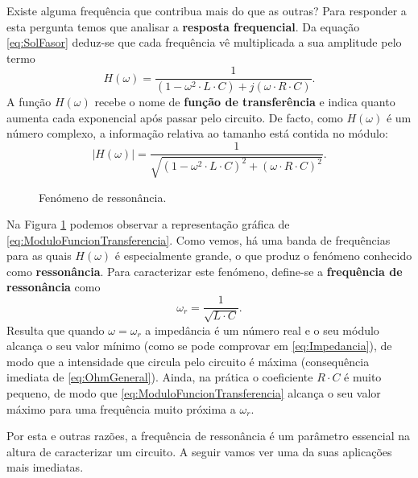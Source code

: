Existe alguma frequência que contribua mais do que as outras? Para responder a esta pergunta temos que analisar a \textbf{resposta frequencial}. Da equação \eqref{eq:SolFasor} deduz-se que cada frequência vê multiplicada a sua amplitude pelo termo
\begin{equation}
  \label{eq:FuncionTransferencia}
  H(\omega) = \frac{1}{(1-\omega^2 \cdot L\cdot C) + j(\omega \cdot R\cdot C)}.
\end{equation}
A função $H(\omega)$ recebe o nome de \textbf{função de transferência} e indica quanto aumenta cada exponencial após passar pelo circuito. De facto, como $H(\omega)$ é um número complexo, a informação relativa ao tamanho está contida no módulo:
\begin{equation}
  \label{eq:ModuloFuncionTransferencia}
  \left|H(\omega)\right| = \frac{1}{\sqrt{(1-\omega^2\cdot L\cdot C)^2 + (\omega \cdot R\cdot C)^2}}.
\end{equation}

\begin{figure}
\begin{figurebox}
    \vspace{5pt}
    \centering
    \scalebox{0.4}{ }
    \vspace{-10pt}
    \caption{Fenómeno de ressonância.}
    \label{fig:Resonancia}
\end{figurebox}
\end{figure}


Na Figura \ref{fig:Resonancia} podemos observar a representação gráfica de \eqref{eq:ModuloFuncionTransferencia}. Como vemos, há uma banda de frequências para as quais $H(\omega)$ é especialmente grande, o que produz o fenómeno conhecido como \textbf{ressonância}. Para caracterizar este fenómeno, define-se a \textbf{frequência de ressonância} como
\begin{equation}
  \label{eq:FrecuenciaNatural}
  \omega_r = \frac{1}{\sqrt{L\cdot C}}.
\end{equation}
Resulta que quando $\omega=\omega_r$ a impedância é um número real e o seu módulo alcança o seu valor mínimo (como se pode comprovar em \eqref{eq:Impedancia}), de modo que a intensidade que circula pelo circuito é máxima (consequência imediata de \eqref{eq:OhmGeneral}). Ainda, na prática o coeficiente $R\cdot C$ é muito pequeno, de modo que \eqref{eq:ModuloFuncionTransferencia} alcança o seu valor máximo para uma frequência muito próxima a $\omega_r$.

Por esta e outras razões, a frequência de ressonância é um parâmetro essencial na altura de caracterizar um circuito. A seguir vamos ver uma da suas aplicações mais imediatas.


